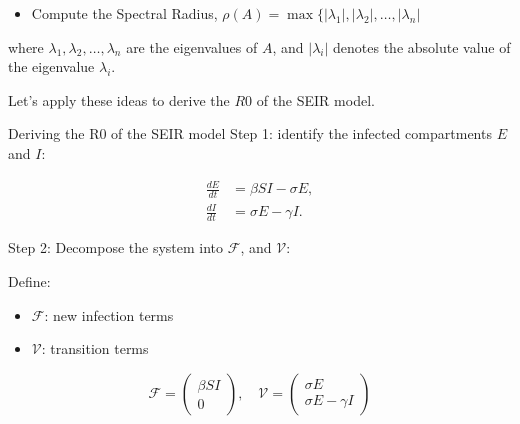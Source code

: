 \documentclass[
  ignorenonframetext,
]{beamer}
\providecommand{\tightlist}{%
  \setlength{\itemsep}{0pt}\setlength{\parskip}{0pt}}\usepackage{longtable,booktabs,array}
\begin{document}
\begin{frame}
\begin{itemize}
\tightlist
\item
  Compute the Spectral Radius,
  \(\rho(A) = \max \{ |\lambda_1|, |\lambda_2|, \ldots, |\lambda_n|\)
\end{itemize}

where \(\lambda_1, \lambda_2, \ldots, \lambda_n\) are the eigenvalues of
\(A\), and \(|\lambda_i|\) denotes the absolute value of the eigenvalue
\(\lambda_i\).

Let's apply these ideas to derive the \(R0\) of the SEIR model.
\end{frame}

\begin{frame}
\begin{block}{Deriving the R0 of the SEIR model}
\label{deriving-the-r0-of-the-seir-model}
Step 1: identify the infected compartments \(E\) and \(I\):

\begin{equation*}
\begin{aligned}
\frac{dE}{dt} &= \beta S I - \sigma E, \\
\frac{dI}{dt} &= \sigma E - \gamma I.
\end{aligned}
\end{equation*}
\end{block}
\end{frame}

\begin{frame}
Step 2: Decompose the system into \(\mathcal{F}\), and \(\mathcal{V}\):

Define:

\begin{itemize}
\tightlist
\item
  \(\mathcal{F}\): new infection terms
\item
  \(\mathcal{V}\): transition terms
\end{itemize}

\begin{equation*}
\mathcal{F} = \begin{pmatrix}
\beta S I \\
0
\end{pmatrix},
\quad
\mathcal{V} = \begin{pmatrix}
\sigma E \\
\sigma E - \gamma I
\end{pmatrix}
\end{equation*}
\end{frame}
\end{document}
